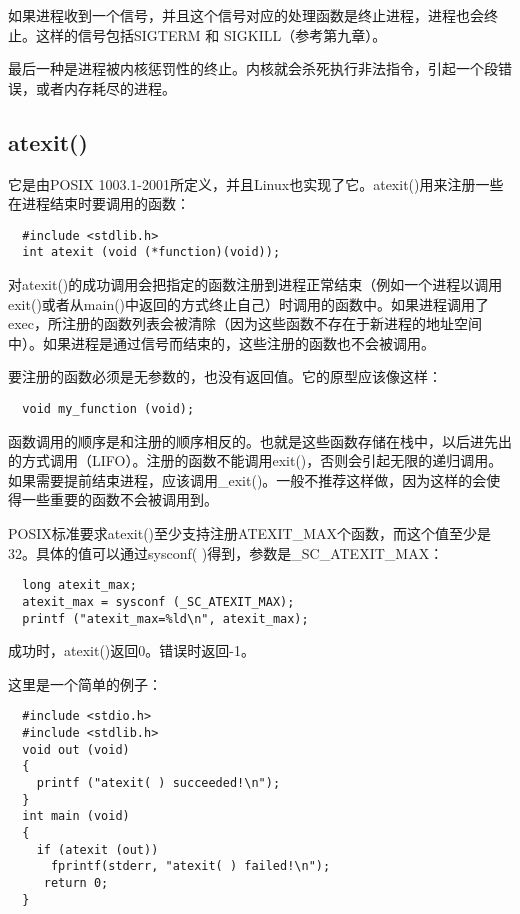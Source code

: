 如果进程收到一个信号，并且这个信号对应的处理函数是终止进程，进程也会终止。这样的信号包括SIGTERM 和 SIGKILL（参考第九章）。

最后一种是进程被内核惩罚性的终止。内核就会杀死执行非法指令，引起一个段错误，或者内存耗尽的进程。

\subsection{atexit()}

它是由POSIX 1003.1-2001所定义，并且Linux也实现了它。atexit()用来注册一些在进程结束时要调用的函数：

\begin{lstlisting}
  #include <stdlib.h>
  int atexit (void (*function)(void));
\end{lstlisting}

对atexit()的成功调用会把指定的函数注册到进程正常结束（例如一个进程以调用exit()或者从main()中返回的方式终止自己）时调用的函数中。如果进程调用了exec，所注册的函数列表会被清除（因为这些函数不存在于新进程的地址空间中）。如果进程是通过信号而结束的，这些注册的函数也不会被调用。

要注册的函数必须是无参数的，也没有返回值。它的原型应该像这样：

\begin{lstlisting}
  void my_function (void);
\end{lstlisting}

函数调用的顺序是和注册的顺序相反的。也就是这些函数存储在栈中，以后进先出的方式调用（LIFO）。注册的函数不能调用exit()，否则会引起无限的递归调用。如果需要提前结束进程，应该调用\_exit()。一般不推荐这样做，因为这样的会使得一些重要的函数不会被调用到。

POSIX标准要求atexit()至少支持注册ATEXIT\_MAX个函数，而这个值至少是32。具体的值可以通过sysconf( )得到，参数是\_SC\_ATEXIT\_MAX：

\begin{lstlisting}
  long atexit_max;
  atexit_max = sysconf (_SC_ATEXIT_MAX);
  printf ("atexit_max=%ld\n", atexit_max);
\end{lstlisting}

成功时，atexit()返回0。错误时返回-1。

这里是一个简单的例子：

\begin{lstlisting}
  #include <stdio.h>
  #include <stdlib.h>
  void out (void)
  {
    printf ("atexit( ) succeeded!\n");
  }
  int main (void)
  {
    if (atexit (out))
      fprintf(stderr, "atexit( ) failed!\n");
     return 0;
  }
\end{lstlisting}

